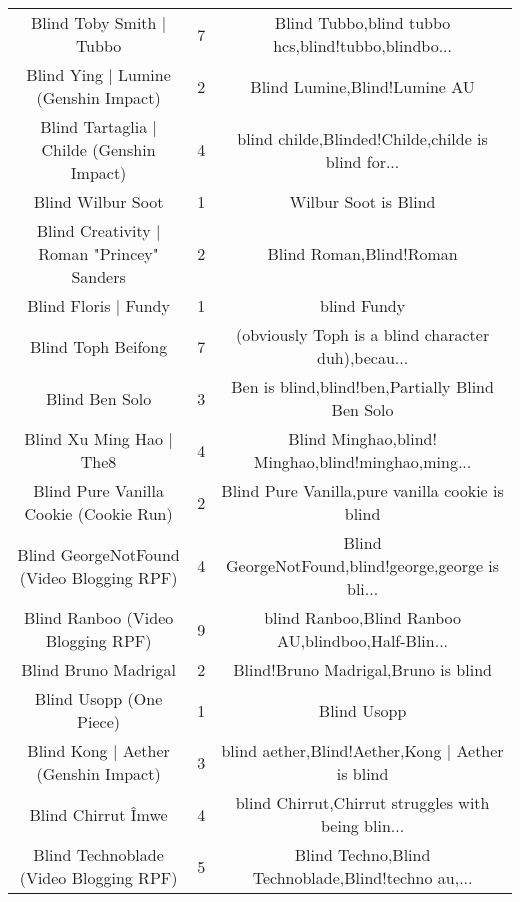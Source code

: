 \begin{table}[h!]
{\begin{tabular}{|c|c|c|}
                          Blind Toby Smith | Tubbo &      7 & Blind Tubbo,blind tubbo hcs,blind!tubbo,blindbo... \\
              Blind Ying | Lumine (Genshin Impact) &      2 &                       Blind Lumine,Blind!Lumine AU \\
         Blind Tartaglia | Childe (Genshin Impact) &      4 & blind childe,Blinded!Childe,childe is blind for... \\
                                 Blind Wilbur Soot &      1 &                               Wilbur Soot is Blind \\
        Blind Creativity | Roman "Princey" Sanders &      2 &                            Blind Roman,Blind!Roman \\
                              Blind Floris | Fundy &      1 &                                        blind Fundy \\
                                Blind Toph Beifong &      7 & (obviously Toph is a blind character duh),becau... \\
                                    Blind Ben Solo &      3 &    Ben is blind,blind!ben,Partially Blind Ben Solo \\
                          Blind Xu Ming Hao | The8 &      4 & Blind Minghao,blind! Minghao,blind!minghao,ming... \\
            Blind Pure Vanilla Cookie (Cookie Run) &      2 &    Blind Pure Vanilla,pure vanilla cookie is blind \\
         Blind GeorgeNotFound (Video Blogging RPF) &      4 & Blind GeorgeNotFound,blind!george,george is bli... \\
                 Blind Ranboo (Video Blogging RPF) &      9 & blind Ranboo,Blind Ranboo AU,blindboo,Half-Blin... \\
                              Blind Bruno Madrigal &      2 &                Blind!Bruno Madrigal,Bruno is blind \\
                           Blind Usopp (One Piece) &      1 &                                        Blind Usopp \\
              Blind Kong | Aether (Genshin Impact) &      3 &   blind aether,Blind!Aether,Kong | Aether is blind \\
                                Blind Chirrut Îmwe &      4 & blind Chirrut,Chirrut struggles with being blin... \\
            Blind Technoblade (Video Blogging RPF) &      5 & Blind Techno,Blind Technoblade,Blind!techno au,... \\

\end{tabular}}
\end{table}

